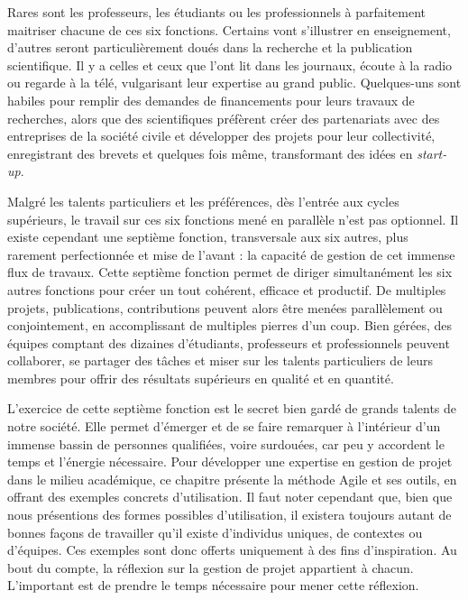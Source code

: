 \documentclass[
  letterpaper,
  DIV=11,
  numbers=noendperiod,
  oneside]{scrreprt}
\begin{document}
Rares sont les professeurs, les étudiants ou les professionnels à
parfaitement maitriser chacune de ces six fonctions. Certains vont
s'illustrer en enseignement, d'autres seront particulièrement doués dans
la recherche et la publication scientifique. Il y a celles et ceux que
l'ont lit dans les journaux, écoute à la radio ou regarde à la télé,
vulgarisant leur expertise au grand public. Quelques-uns sont habiles
pour remplir des demandes de financements pour leurs travaux de
recherches, alors que des scientifiques préfèrent créer des partenariats
avec des entreprises de la société civile et développer des projets pour
leur collectivité, enregistrant des brevets et quelques fois même,
transformant des idées en \emph{start-up}.

Malgré les talents particuliers et les préférences, dès l'entrée aux
cycles supérieurs, le travail sur ces six fonctions mené en parallèle
n'est pas optionnel. Il existe cependant une septième fonction,
transversale aux six autres, plus rarement perfectionnée et mise de
l'avant : la capacité de gestion de cet immense flux de travaux. Cette
septième fonction permet de diriger simultanément les six autres
fonctions pour créer un tout cohérent, efficace et productif. De
multiples projets, publications, contributions peuvent alors être menées
parallèlement ou conjointement, en accomplissant de multiples pierres
d'un coup. Bien gérées, des équipes comptant des dizaines d'étudiants,
professeurs et professionnels peuvent collaborer, se partager des tâches
et miser sur les talents particuliers de leurs membres pour offrir des
résultats supérieurs en qualité et en quantité.

L'exercice de cette septième fonction est le secret bien gardé de grands
talents de notre société. Elle permet d'émerger et de se faire remarquer
à l'intérieur d'un immense bassin de personnes qualifiées, voire
surdouées, car peu y accordent le temps et l'énergie nécessaire. Pour
développer une expertise en gestion de projet dans le milieu académique,
ce chapitre présente la méthode Agile et ses outils, en offrant des
exemples concrets d'utilisation. Il faut noter cependant que, bien que
nous présentions des formes possibles d'utilisation, il existera
toujours autant de bonnes façons de travailler qu'il existe d'individus
uniques, de contextes ou d'équipes. Ces exemples sont donc offerts
uniquement à des fins d'inspiration. Au bout du compte, la réflexion sur
la gestion de projet appartient à chacun. L'important est de prendre le
temps nécessaire pour mener cette réflexion.
\end{document}
